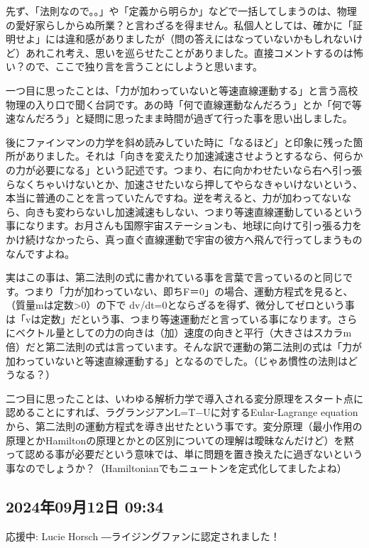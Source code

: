 先ず、「法則なので。。」や「定義から明らか」などで一括してしまうのは、物理の愛好家らしからぬ所業？と言わざるを得ません。私個人としては、確かに「証明せよ」には違和感がありましたが（問の答えにはなっていないかもしれないけど）あれこれ考え、思いを巡らせたことがありました。直接コメントするのは怖い？ので、ここで独り言を言うことにしようと思います。

一つ目に思ったことは、「力が加わっていないと等速直線運動する」と言う高校物理の入り口で聞く台詞です。あの時「何で直線運動なんだろう」とか「何で等速なんだろう」と疑問に思ったまま時間が過ぎて行った事を思い出しました。

後にファインマンの力学を斜め読みしていた時に「なるほど」と印象に残った箇所がありました。それは「向きを変えたり加速減速させようとするなら、何らかの力が必要になる」という記述です。つまり、右に向かわせたいなら右へ引っ張らなくちゃいけないとか、加速させたいなら押してやらなきゃいけないという、本当に普通のことを言っていたんですね。逆を考えると、力が加わってないなら、向きも変わらないし加速減速もしない、つまり等速直線運動しているという事になります。お月さんも国際宇宙ステーションも、地球に向けて引っ張る力をかけ続けなかったら、真っ直ぐ直線運動で宇宙の彼方へ飛んで行ってしまうものなんですよね。

実はこの事は、第二法則の式に書かれている事を言葉で言っているのと同じです。つまり「力が加わっていない、即ちF＝0」の場合、運動方程式を見ると、（質量mは定数>0）の下で dv/dt=0とならざるを得ず、微分してゼロという事は「vは定数」だという事、つまり等速運動だと言っている事になります。さらにベクトル量としての力の向きは（加）速度の向きと平行（大きさはスカラm倍）だと第二法則の式は言っています。そんな訳で運動の第二法則の式は「力が加わっていないと等速直線運動する」となるのでした。（じゃあ慣性の法則はどうなる？）

二つ目に思ったことは、いわゆる解析力学で導入される変分原理をスタート点に認めることにすれば、ラグランジアンL=T−Uに対するEular-Lagrange equation から、第二法則の運動方程式を導き出せたという事です。変分原理（最小作用の原理とかHamiltonの原理とかとの区別についての理解は曖昧なんだけど）を黙って認める事が必要だという意味では、単に問題を置き換えたに過ぎないという事なのでしょうか？（Hamiltonianでもニュートンを定式化してましたよね）

\subsection*{2024年09月12日 09:34}

応援中: Lucie Horsch ―ライジングファンに認定されました！🎉

